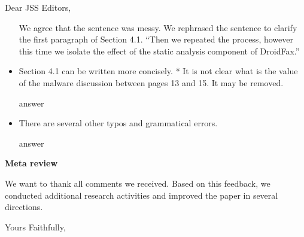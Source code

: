 \documentclass[12pt,english]{scrlttr2}
\begin{document}
\begin{letter}{Dear JSS Editors,}
\begin{itemize}
{\color{blue}{\bf Answer.} We agree that the sentence was messy. We rephrased the sentence to clarify the first paragraph of Section 4.1. ``Then we repeated the process, however this time we isolate the effect of the static analysis component of DroidFax.''}

\vspace{0.2cm}

\item Section 4.1 can be written more concisely.
* It is not clear what is the value of the malware discussion between pages 13 and 15. It may be removed.


\vspace{0.2cm}

{\color{blue}{\bf Answer.} answer}

\vspace{0.2cm}

\item There are several other typos and grammatical errors.


\vspace{0.2cm}

{\color{blue}{\bf Answer.} answer}





\end{itemize}



{\bf Meta review}

We want to thank all comments we received. Based on this feedback, we conducted additional research activities and improved the paper in several directions.

\closing{Yours Faithfully,}

% 
% 

\end{letter}
\end{document}
